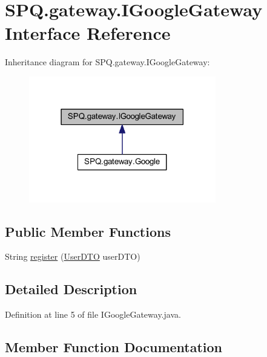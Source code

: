 \hypertarget{interface_s_p_q_1_1gateway_1_1_i_google_gateway}{}\section{S\+P\+Q.\+gateway.\+I\+Google\+Gateway Interface Reference}
\label{interface_s_p_q_1_1gateway_1_1_i_google_gateway}


Inheritance diagram for S\+P\+Q.\+gateway.\+I\+Google\+Gateway\+:
\nopagebreak
\begin{figure}[H]
\begin{center}
\leavevmode
\includegraphics[width=231pt]{interface_s_p_q_1_1gateway_1_1_i_google_gateway__inherit__graph}
\end{center}
\end{figure}
\subsection*{Public Member Functions}
\begin{DoxyCompactItemize}
\item 
String \mbox{\hyperlink{interface_s_p_q_1_1gateway_1_1_i_google_gateway_a35bfcf888bfbf45ab05f33c89348052a}{register}} (\mbox{\hyperlink{class_s_p_q_1_1dto_1_1_user_d_t_o}{User\+D\+TO}} user\+D\+TO)
\end{DoxyCompactItemize}


\subsection{Detailed Description}


Definition at line 5 of file I\+Google\+Gateway.\+java.



\subsection{Member Function Documentation}
\mbox{\label{interface_s_p_q_1_1gateway_1_1_i_google_gateway_a35bfcf888bfbf45ab05f33c89348052a}} 
